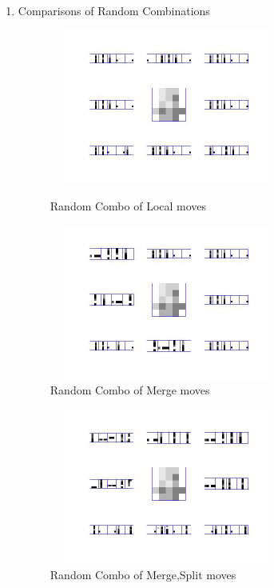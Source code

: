 \documentclass{article}
\begin{document}
\begin{spacing}{1.1}
\begin{enumerate}
\item Comparisons of Random Combinations 
\begin{figure}[h] 
  \begin{minipage}[b]{0.5\textwidth} 
    \centering 
    \includegraphics[width=3in,height=2in]{bu_l.jpg} 
    \caption{Random Combo of Local moves}
    \label{fig:by:table} 
  \end{minipage}%
  \begin{minipage}[b]{0.5\textwidth} 
    \centering 
    \includegraphics[width=3in,height=2in]{bu_m.jpg} 
    \caption{Random Combo of Merge moves}
    \label{fig:by:table}  
   \end{minipage}%
\end{figure}
\begin{figure}[h] 
  \begin{minipage}[b]{0.5\textwidth} 
    \centering 
    \includegraphics[width=3in,height=2in]{bu_ms.jpg} 
    \caption{Random Combo of Merge,Split moves}
    \label{fig:by:table} 
  \end{minipage}%

\end{figure}
\end{enumerate}
\end{spacing}
\end{document}
